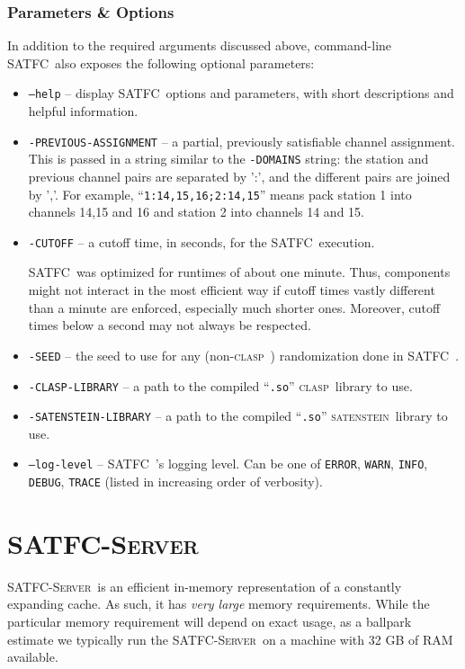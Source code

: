 \documentclass[
10pt, %
letterpaper, %
oneside, %
headinclude,footinclude, %
BCOR5mm, %
needspace, %
]{scrartcl}
\newcommand{\SATFC}{\textsc{SATFC}~}
\newcommand{\SATFCServer}{\textsc{SATFC-Server}~}
\newcommand{\clasp}{\textsc{clasp}~}
\newcommand{\satenstein}{\textsc{satenstein}~}
\begin{document}
\subsubsection{Parameters \& Options}
In addition to the required arguments discussed above, command-line \SATFC also exposes the following optional parameters:
\begin{itemize}
    \item \texttt{---help} -- display \SATFC options and parameters, with short descriptions and helpful information.
    \item \texttt{-PREVIOUS-ASSIGNMENT} -- a partial, previously satisfiable channel assignment. This is passed in a string similar to the \texttt{-DOMAINS} string: the station and previous channel pairs are separated by ':', and the different pairs are joined by ','. For example, ``\texttt{1:14,15,16;2:14,15}'' means pack station 1 into channels 14,15 and 16 and station 2 into channels 14 and 15.
    \item \texttt{-CUTOFF} -- a cutoff time, in seconds, for the \SATFC execution.
    \begin{fwarning}
        \SATFC was optimized for runtimes of about one minute. Thus, components might not interact in the most efficient way if cutoff times vastly different than a minute are enforced, especially much shorter ones. Moreover, cutoff times below a second may not always be respected.
    \end{fwarning}
    \item \texttt{-SEED} -- the seed to use for any (non-\clasp) randomization done in \SATFC.
    \item \texttt{-CLASP-LIBRARY} -- a path to the compiled ``\texttt{.so}'' \clasp library to use.
    \item \texttt{-SATENSTEIN-LIBRARY} -- a path to the compiled ``\texttt{.so}'' \satenstein library to use.
    \item \texttt{---log-level} -- \SATFC's logging level. Can be one of \texttt{ERROR}, \texttt{WARN}, \texttt{INFO}, \texttt{DEBUG}, \texttt{TRACE} (listed in increasing order of verbosity).
\end{itemize}

\section{\SATFCServer}

\begin{fwarning}
    \SATFCServer is an efficient in-memory representation of a constantly expanding cache. As such, it has \emph{very large} memory requirements. While the particular memory requirement will depend on exact usage, as a ballpark estimate we typically run the \SATFCServer on a machine with 32 GB of RAM available.
\end{fwarning}
\end{document}
